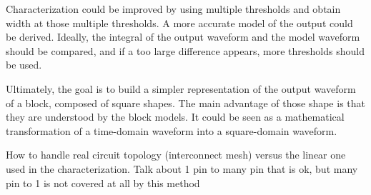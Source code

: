 Characterization could be improved by using multiple thresholds and obtain width at those multiple thresholds.
A more accurate model of the output could be derived.
Ideally, the integral of the output waveform and the model waveform should be compared, and if a too large difference appears, more thresholds should be used.


Ultimately, the goal is to build a simpler representation of the output waveform of a block, composed of square shapes.
The main advantage of those shape is that they are understood by the block models.
It could be seen as a mathematical transformation of a time-domain waveform into a square-domain waveform.

How to handle real circuit topology (interconnect mesh) versus the linear one used in the characterization.
Talk about 1 pin to many pin that is ok, but many pin to 1 is not covered at all by this method

